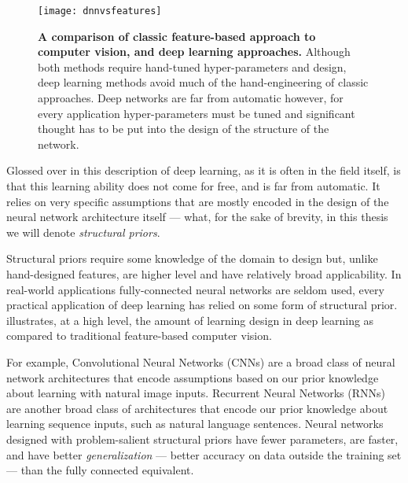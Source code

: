 \documentclass[thesis]{subfiles}
\begin{document}
\begin{figure}[tbp]
	\centering
	\texttt{[image: dnnvsfeatures]}
	\caption[Classic feature-based approach \vs{}deep learning.]{\textbf{A comparison of classic feature-based approach to computer vision, and deep learning approaches.} Although both methods require hand-tuned hyper-parameters and design, deep learning methods avoid much of the hand-engineering of classic approaches. Deep networks are far from automatic however, for every application hyper-parameters must be tuned and significant thought has to be put into the design of the structure of the network.}\label{dnnvsfeatures}
\end{figure}
	
Glossed over in this description of deep learning, as it is often in the field itself, is that this learning ability does not come for free, and is far from automatic. It relies on very specific assumptions that are mostly encoded in the design of the neural network architecture itself --- what, for the sake of brevity, in this thesis we will denote \emph{structural priors}.

Structural priors require some knowledge of the domain to design but, unlike hand-designed features, are higher level and have relatively broad applicability. In real-world applications fully-connected neural networks are seldom used, every practical application of deep learning has relied on some form of structural prior.  illustrates, at a high level, the amount of learning \vs{}design in deep learning as compared to traditional feature-based computer vision.

For example, Convolutional Neural Networks (CNNs) are a broad class of neural network architectures that encode assumptions based on our prior knowledge about learning with natural image inputs. Recurrent Neural Networks (RNNs) are another broad class of architectures that encode our prior knowledge about learning sequence inputs, such as natural language sentences. Neural networks designed with problem-salient structural priors have fewer parameters, are faster, and have better \emph{generalization} --- better accuracy on data outside the training set --- than the fully connected equivalent.
\end{document}
